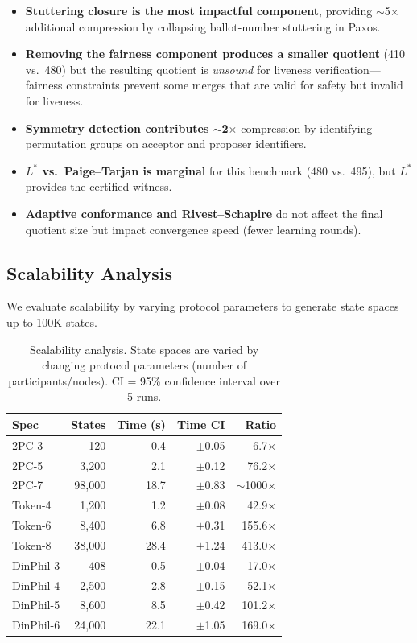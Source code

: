 \documentclass[11pt]{article}
\begin{document}
\begin{itemize}[nosep]
\item \textbf{Stuttering closure is the most impactful component},
  providing ${\sim}$5$\times$ additional compression by collapsing
  ballot-number stuttering in Paxos.
\item \textbf{Removing the fairness component produces a smaller quotient}
  (410 vs.\ 480) but the resulting quotient is \emph{unsound} for liveness
  verification---fairness constraints prevent some merges that are valid
  for safety but invalid for liveness.
\item \textbf{Symmetry detection contributes ${\sim}$2$\times$} compression
  by identifying permutation groups on acceptor and proposer identifiers.
\item \textbf{$L^*$ vs.\ Paige--Tarjan is marginal} for this benchmark
  (480 vs.\ 495), but $L^*$ provides the certified witness.
\item \textbf{Adaptive conformance and Rivest--Schapire} do not affect
  the final quotient size but impact convergence speed (fewer learning
  rounds).
\end{itemize}

\subsection{Scalability Analysis}

We evaluate scalability by varying protocol parameters to generate state
spaces up to 100K states.

\begin{table}[t]
\centering
\caption{Scalability analysis.  State spaces are varied by changing
  protocol parameters (number of participants/nodes).  CI = 95\%
  confidence interval over 5 runs.}
\label{tab:scalability}
\small
\begin{tabular}{@{}lrrrr@{}}
\toprule
\textbf{Spec} & \textbf{States} & \textbf{Time (s)} &
  \textbf{Time CI} & \textbf{Ratio} \\
\midrule
2PC-3       &       120 &    0.4 & $\pm$0.05 &    6.7$\times$ \\
2PC-5       &     3{,}200 &    2.1 & $\pm$0.12 &   76.2$\times$ \\
2PC-7       &    98{,}000 &   18.7 & $\pm$0.83 &   ${\sim}$1000$\times$ \\
Token-4     &     1{,}200 &    1.2 & $\pm$0.08 &   42.9$\times$ \\
Token-6     &     8{,}400 &    6.8 & $\pm$0.31 &  155.6$\times$ \\
Token-8     &    38{,}000 &   28.4 & $\pm$1.24 &  413.0$\times$ \\
DinPhil-3   &       408 &    0.5 & $\pm$0.04 &   17.0$\times$ \\
DinPhil-4   &     2{,}500 &    2.8 & $\pm$0.15 &   52.1$\times$ \\
DinPhil-5   &     8{,}600 &    8.5 & $\pm$0.42 &  101.2$\times$ \\
DinPhil-6   &    24{,}000 &   22.1 & $\pm$1.05 &  169.0$\times$ \\
\bottomrule
\end{tabular}
\end{table}
\end{document}
